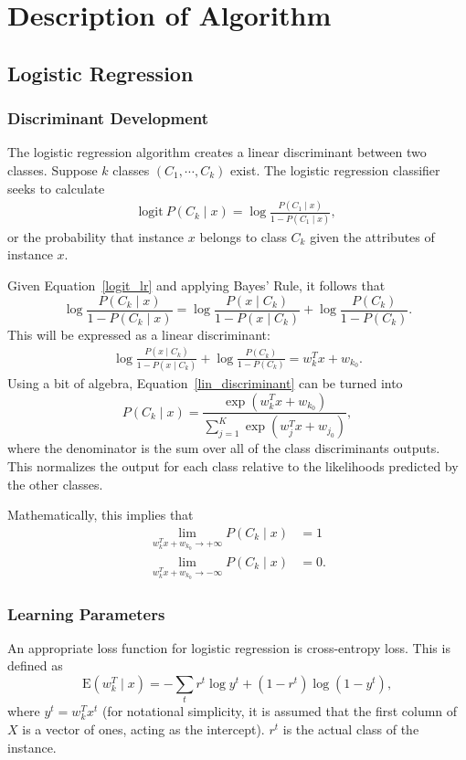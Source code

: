 \documentclass{amsart}
\begin{document}
    \section{Description of Algorithm}
    \subsection{Logistic Regression}
    \subsubsection*{Discriminant Development}
    The logistic regression algorithm\cite{logistic_regression}
    creates a linear discriminant between two classes. Suppose
    $k$ classes $(C_1, \cdots, C_k)$ exist.
    The logistic regression classifier seeks to calculate
    \begin{align}
        \textrm{logit} ~P(C_k \mid x) = \log \frac{P(C_1 \mid x)}{1 - P(C_1 \mid x)},
        \label{logit_lr}
    \end{align}
    or the probability that instance $x$ belongs to class $C_k$ given the attributes of instance
    $x$.

    Given Equation~\ref{logit_lr} and applying Bayes' Rule, it follows that
    \[
        \log \frac{P(C_k \mid x)}{1 - P(C_k \mid x)} =
        \log \frac{P(x \mid C_k)}{1 - P(x \mid C_k)} + \log \frac{P(C_k)}{1 - P(C_k)}.
    \]
    This will be expressed as a linear discriminant:
    \begin{align}
         \log \frac{P(x \mid C_k)}{1 - P(x \mid C_k)} + \log \frac{P(C_k)}{1 - P(C_k)} = w_k^T x + w_{k_0}.
        \label{lin_discriminant}
    \end{align}
    Using a bit of algebra, Equation~\ref{lin_discriminant} can be turned into \[
        P(C_k \mid x) = \frac{\exp{(w_k^T x + w_{k_0})}}{\sum_{j=1}^K \exp{(w_j^T x + w_{j_0})}},
    \]
    where the denominator is the sum over all of the class discriminants outputs. This normalizes
    the output for each class relative to the likelihoods predicted by the other classes.


    Mathematically, this implies that
    \begin{align*}
        \lim_{w_k^T x + w_{k_0} \to +\infty} P(C_k \mid x) &= 1 \\
        \lim_{w_k^T x + w_{k_0} \to -\infty} P(C_k \mid x) &= 0.
    \end{align*}

    \subsubsection*{Learning Parameters}
    An appropriate loss function for logistic regression is cross-entropy loss. This is defined
    as
    \[
        \textrm{E}(w_k^T \mid x) = -\sum_{t} r^t \log y^t + (1 - r^t)\log (1 - y^t),
    \]
    where $y^t = w_k^T x^t$ (for notational simplicity, it is assumed that the first column of $X$ is a vector of ones, acting
    as the intercept). $r^t$ is the actual class of the instance.
\end{document}
